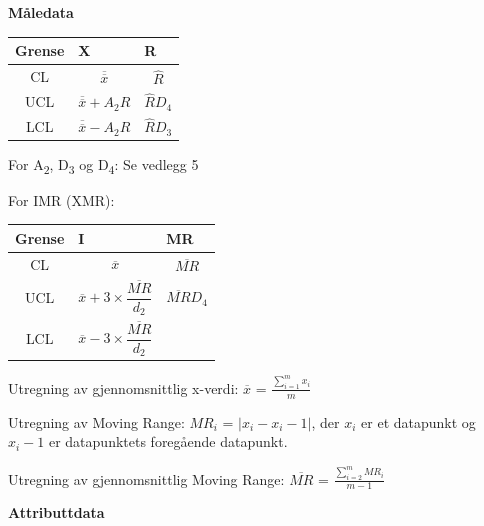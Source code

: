 \documentclass[
]{book}
\begin{document}
\textbf{Måledata}

\begin{table}[!h]
\centering
\begin{tabular}{c|>{\centering\arraybackslash}p{5cm}|>{\centering\arraybackslash}p{5cm}}
\hline
Grense & X & R\\
\hline
CL & $$\overline{\overline{x}}$$ & $$\hat{R}$$\\
\hline
UCL & $$\overline{\overline{x}} + A_2\hat{R}$$ & $$\hat{R}D_4$$\\
\hline
LCL & $$\overline{\overline{x}} - A_2\hat{R}$$ & $$\hat{R}D_3$$\\
\hline
\end{tabular}
\end{table}

For A\textsubscript{2}, D\textsubscript{3} og D\textsubscript{4}: Se vedlegg 5

For IMR (XMR):

\begin{table}[!h]
\centering
\begin{tabular}{c|>{\centering\arraybackslash}p{5cm}|>{\centering\arraybackslash}p{5cm}}
\hline
Grense & I & MR\\
\hline
CL & $$\overline{x}$$ & $$\overline{MR}$$\\
\hline
UCL & $$\overline{x} + 3 \times \frac{\overline{MR}}{d_2}$$ & $$\overline{MR}D_4$$\\
\hline
LCL & $$\overline{x} - 3 \times \frac{\overline{MR}}{d_2}$$ & \\
\hline
\end{tabular}
\end{table}

Utregning av gjennomsnittlig x-verdi: \(\overline{x}\) = \(\frac{\sum_{i = 1}^{m}x_i}{m}\)

Utregning av Moving Range: \(MR_i\) = \(|x_i-x_i-1|\), der \(x_i\) er et datapunkt og \(x_i-1\) er datapunktets foregående datapunkt.

Utregning av gjennomsnittlig Moving Range: \(\overline{MR}\) = \(\frac{\sum_{i = 2}^{m}MR_i}{m-1}\)

\textbf{Attributtdata}
\end{document}
